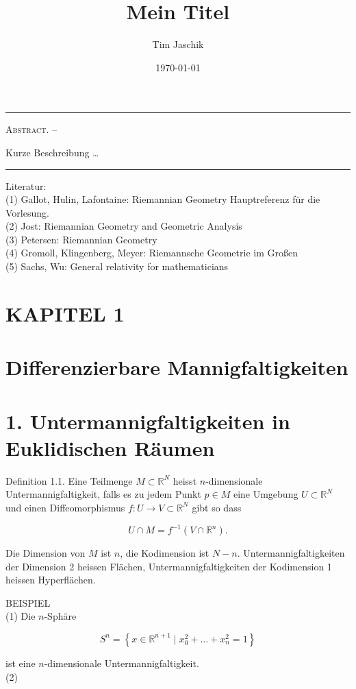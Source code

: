 \documentclass[10pt, letterpaper]{article}
\title{Mein Titel}
\author{Tim Jaschik}
\date{\today}
\renewenvironment{abstract}
  {
    \begin{adjustwidth}{1.5cm}{1.5cm}
    \small
    \textsc{Abstract. –}%
  }
  {
    \end{adjustwidth}
  }
\begin{document}
\maketitle
\rule{\textwidth}{0.5pt}
\begin{abstract}
Kurze Beschreibung …
\end{abstract}
\rule{\textwidth}{0.5pt}
\vspace{0.5cm}

\tableofcontents

\pagebreak


Literatur:\\
(1) Gallot, Hulin, Lafontaine: Riemannian Geometry Hauptreferenz für die Vorlesung.\\
(2) Jost: Riemannian Geometry and Geometric Analysis\\
(3) Petersen: Riemannian Geometry\\
(4) Gromoll, Klingenberg, Meyer: Riemannsche Geometrie im Großen\\
(5) Sachs, Wu: General relativity for mathematicians


\section*{KAPITEL 1}
\section*{Differenzierbare Mannigfaltigkeiten}
\section*{1. Untermannigfaltigkeiten in Euklidischen Räumen}
Definition 1.1. Eine Teilmenge $M \subset \mathbb{R}^{N}$ heisst $n$-dimensionale Untermannigfaltigkeit, falls es zu jedem Punkt $p \in M$ eine Umgebung $U \subset \mathbb{R}^{N}$ und einen Diffeomorphismus $f: U \rightarrow V \subset \mathbb{R}^{N}$ gibt so dass

$$
U \cap M=f^{-1}\left(V \cap \mathbb{R}^{n}\right) .
$$

Die Dimension von $M$ ist $n$, die Kodimension ist $N-n$. Untermannigfaltigkeiten der Dimension 2 heissen Flächen, Untermannigfaltigkeiten der Kodimension 1 heissen Hyperflächen.

BEISPIEL\\
(1) Die $n$-Sphäre

$$
S^{n}=\left\{x \in \mathbb{R}^{n+1} \mid x_{0}^{2}+\ldots+x_{n}^{2}=1\right\}
$$

ist eine $n$-dimensionale Untermannigfaltigkeit.\\
(2)
\end{document}
